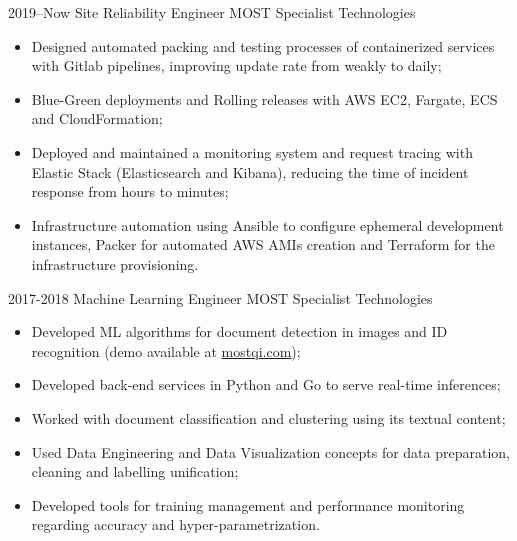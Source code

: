 \documentclass[a4paper]{cv-friggeri-x}
\begin{document}
\begin{entrylist}


\entry
    {2019--Now}
    {Site Reliability Engineer}
    {MOST Specialist Technologies}
    {\begin{itemize}
        \item Designed automated packing and testing processes of containerized services with Gitlab pipelines, improving update rate from weakly to daily;
        \item Blue-Green deployments and Rolling releases with AWS EC2, Fargate, ECS and CloudFormation;
        \item Deployed and maintained a monitoring system and request tracing with Elastic Stack (Elasticsearch and Kibana), reducing the time of incident response from hours to minutes;
        \item Infrastructure automation using Ansible to configure ephemeral development instances, Packer for automated AWS AMIs creation and Terraform for the infrastructure provisioning.
    \end{itemize}}

\entry
    {2017-2018}
    {Machine Learning Engineer}
    {MOST Specialist Technologies}
    {\begin{itemize}
        \item Developed ML algorithms for document detection in images and ID recognition (demo available at \href{mostqi.com}{mostqi.com});
        \item Developed back-end services in Python and Go to serve real-time inferences;
        \item Worked with document classification and clustering using its textual content;
        \item Used Data Engineering and Data Visualization concepts for data preparation, cleaning and labelling unification;
        \item Developed tools for training management and performance monitoring regarding accuracy and hyper-parametrization.
    \end{itemize}}






\end{entrylist}
\end{document}
